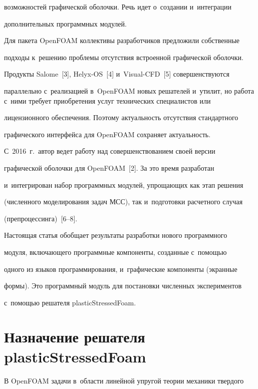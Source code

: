 возможностей графической оболочки. Речь идет о~создании и~интеграции 


дополнительных программных модулей.


   


   Для пакета OpenFOAM коллективы разработчиков предложили собственные 


подходы к~решению проблемы отсутствия встроенной графической оболочки. 


Продукты Salome~[3], Helyx-OS~[4] и~Visual-CFD~[5] совершенствуются 


параллельно с~реализацией в~\mbox{OpenFOAM} новых решателей и~утилит, но работа с~ними требует приобретения услуг технических специалистов или 


лицензионного обеспечения. Поэтому актуальность отсутствия стандартного 


графического интерфейса для \mbox{OpenFOAM} сохраняет актуальность. 


С~2016~г.\ автор ведет работу над совершенствованием своей версии 


графической оболочки для OpenFOAM~[2]. За это время разработан 


и~интегрирован набор программных модулей, упро\-ща\-ющих как этап решения 


(численного моделирования задач МСС), так и~подготовки расчетного случая 


(препроцессинга)~[6--8].


   


   Настоящая статья обобщает результаты разработки нового программного 


модуля, включающего программные компоненты, созданные с~по\-мощью 


одного из языков программирования, и~графические компоненты (экранные 


формы). Это программный модуль для по\-ста\-нов\-ки чис\-лен\-ных экспериментов  


с~по\-мощью решателя \mbox{plasticStressedFoam}.





\section{Назначение решателя plasticStressedFoam}





   В OpenFOAM задачи в~области линейной упругой тео\-рии механики твердого 


